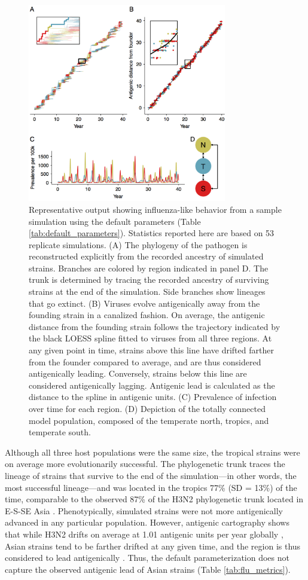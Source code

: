 \documentclass[10pt]{article}
\begin{document}
\begin{figure}[h!]
\centerline{\includegraphics[width=3.42in]{./manuscript/figures/example_run/example_run.pdf}}
\caption{Representative output showing influenza-like behavior from a sample simulation using the default parameters (Table \ref{tab:default_parameters}). 
Statistics reported here are based on 53 replicate simulations. 
(A) The phylogeny of the pathogen is reconstructed explicitly from the recorded ancestry of simulated strains. 
Branches are colored by region indicated in panel D. 
The trunk is determined by tracing the recorded ancestry of surviving strains at the end of the simulation. 
Side branches show lineages that go extinct.
(B) Viruses evolve antigenically away from the founding strain in a canalized fashion.
On average, the antigenic distance from the founding strain follows the trajectory indicated by the black LOESS spline fitted to viruses from all three regions.
At any given point in time, strains above this line have drifted farther from the founder compared to average, and are thus considered antigenically leading.
Conversely, strains below this line are considered antigenically lagging.
Antigenic lead is calculated as the distance to the spline in antigenic units.
(C) Prevalence of infection over time for each region. 
(D) Depiction of the totally connected model population, composed of the temperate north, tropics, and temperate south.} 
\label{fig:example_run}
\end{figure}

Although all three host populations were the same size, the tropical strains were on average more evolutionarily successful. 
The phylogenetic trunk traces the lineage of strains that survive to the end of the simulation---in other words, the most successful lineage---and was located in the tropics 77\% (SD = 13\%) of the time, comparable to the observed 87\% of the H3N2 phylogenetic trunk located in E-S-SE Asia \cite{Bedford:2015fj}. 
Phenotypically, simulated strains were not more antigenically advanced in any particular population. 
However, antigenic cartography shows that while H3N2 drifts on average at 1.01 antigenic units per year globally \cite{Bedford:2014bf}, Asian strains tend to be farther drifted at any given time, and the region is thus considered to lead antigenically \cite{Russell:2008ke, Bedford:2014bf}.
Thus, the default parameterization does not capture the observed antigenic lead of Asian strains (Table \ref{tab:flu_metrics}).
\end{document}
